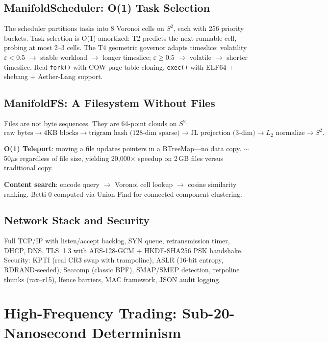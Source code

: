 \documentclass[11pt, a4paper]{article}
\theoremstyle{proofform}
\numberwithin{innerpoints}{subsection}
\numberwithin{disproof}{subsection}
\theoremstyle{mathproof}
\begin{document}
\subsection{ManifoldScheduler: O(1) Task Selection}

The scheduler partitions tasks into 8 Voronoi cells on $S^2$, each with 256 priority buckets. Task selection is O(1) amortized: T2 predicts the next runnable cell, probing at most 2--3 cells. The T4 geometric governor adapts timeslice: volatility $\varepsilon < 0.5$ $\to$ stable workload $\to$ longer timeslice; $\varepsilon \geq 0.5$ $\to$ volatile $\to$ shorter timeslice. Real \texttt{fork()} with COW page table cloning, \texttt{exec()} with ELF64 + shebang + Aether-Lang support.

\subsection{ManifoldFS: A Filesystem Without Files}

Files are not byte sequences. They are 64-point clouds on $S^2$:
\[
\text{raw bytes} \to 4\text{KB blocks} \to \text{trigram hash (128-dim sparse)} \to \text{JL projection (3-dim)} \to L_2 \text{ normalize} \to S^2.
\]

\textbf{O(1) Teleport}: moving a file updates pointers in a BTreeMap---no data copy. $\sim$50$\mu$s regardless of file size, yielding 20{,}000$\times$ speedup on 2\,GB files versus traditional copy.

\textbf{Content search}: encode query $\to$ Voronoi cell lookup $\to$ cosine similarity ranking. Betti-0 computed via Union-Find for connected-component clustering.

\subsection{Network Stack and Security}

Full TCP/IP with listen/accept backlog, SYN queue, retransmission timer, DHCP, DNS. TLS~1.3 with AES-128-GCM + HKDF-SHA256 PSK handshake. Security: KPTI (real CR3 swap with trampoline), ASLR (16-bit entropy, RDRAND-seeded), Seccomp (classic BPF), SMAP/SMEP detection, retpoline thunks (rax--r15), lfence barriers, MAC framework, JSON audit logging.

\section{High-Frequency Trading: Sub-20-Nanosecond Determinism}
\label{sec:hft}
\end{document}
